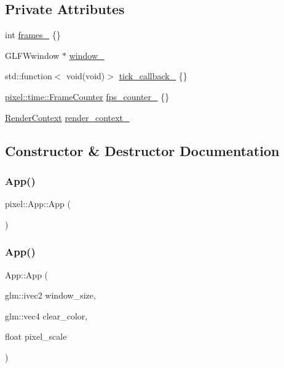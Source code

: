 \subsection*{Private Attributes}
\begin{DoxyCompactItemize}
\item 
int \hyperlink{classpixel_1_1_app_ad4382173f28f58facfa722cccbda6e4b}{frames\+\_\+} \{\}
\item 
G\+L\+F\+Wwindow $\ast$ \hyperlink{classpixel_1_1_app_aaec703aee9656cf040b8c9f5eb4fc3ad}{window\+\_\+}
\item 
std\+::function$<$ void(void)$>$ \hyperlink{classpixel_1_1_app_a5648c144f79952b5c4c51acf304fb2f8}{tick\+\_\+callback\+\_\+} \{\}
\item 
\hyperlink{classpixel_1_1time_1_1_frame_counter}{pixel\+::time\+::\+Frame\+Counter} \hyperlink{classpixel_1_1_app_ac247cd22d9e67b36b360d6ba827ad0e5}{fps\+\_\+counter\+\_\+} \{\}
\item 
\hyperlink{structpixel_1_1_render_context}{Render\+Context} \hyperlink{classpixel_1_1_app_ab118f43ae1840ff7fbdd771694dbe194}{render\+\_\+context\+\_\+}
\end{DoxyCompactItemize}


\subsection{Constructor \& Destructor Documentation}
\mbox{\label{classpixel_1_1_app_af4a37ad9c00effc7cec0c255e03d70c4}} 
\subsubsection{\texorpdfstring{App()}{App()}\hspace{0.1cm}{\footnotesize\ttfamily [1/2]}}
{\footnotesize\ttfamily pixel\+::\+App\+::\+App (\begin{DoxyParamCaption}{ }\end{DoxyParamCaption})\hspace{0.3cm}{\ttfamily [default]}}

\mbox{\label{classpixel_1_1_app_a6fe4a8f0d585fb46ef777b772f33ee23}} 
\subsubsection{\texorpdfstring{App()}{App()}\hspace{0.1cm}{\footnotesize\ttfamily [2/2]}}
{\footnotesize\ttfamily App\+::\+App (\begin{DoxyParamCaption}\item[{glm\+::ivec2}]{window\+\_\+size,  }\item[{glm\+::vec4}]{clear\+\_\+color,  }\item[{float}]{pixel\+\_\+scale }\end{DoxyParamCaption})}



